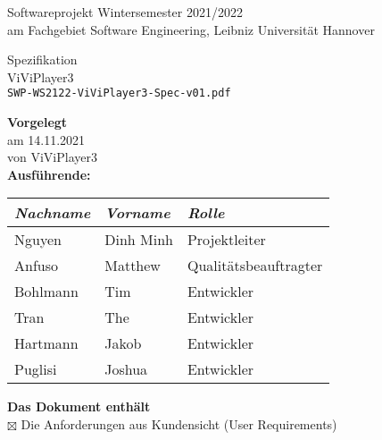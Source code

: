 \documentclass[a4paper, 12pt]{article}
\begin{document}
	\thispagestyle{empty} %
	\begin{center}
		{\Huge Softwareprojekt Wintersemester 2021/2022}\\[.35cm]
		{\large am Fachgebiet Software Engineering, Leibniz Universität Hannover}\\[.1cm]
	\end{center}
	\begin{center}
	\colorbox{lightlightgray}{
		\begin{minipage}{\linewidth}
			\begin{center}
				\vspace{0.2cm}
				{\Huge Spezifikation}\\[.1cm]
				{\Huge ViViPlayer3}\\[.3cm]
				\texttt{SWP-WS2122-ViViPlayer3-Spec-v01.pdf}
				\vspace{0.2cm}
			\end{center}
		\end{minipage}
	}
	\end{center}
	\textbf{Vorgelegt}\\
		\hspace*{1cm}am 14.11.2021 \\
		\hspace*{1cm}von ViViPlayer3\\[0.2cm]
	\textbf{Ausführende:}
		\begin{center}
			\begin{tabular}{|l|l|l|}
				\hline
				\textit{Nachname} 				& \textit{Vorname} 	& \textit{Rolle} \\ \hline\hline
				Nguyen							& Dinh Minh			& Projektleiter \\ \hline
				Anfuso							& Matthew			& Qualitätsbeauftragter \\ \hline
				Bohlmann						& Tim				& Entwickler \\ \hline
				Tran							& The				& Entwickler \\ \hline
				Hartmann						& Jakob				& Entwickler \\ \hline
				Puglisi							& Joshua			& Entwickler \\ \hline
			\end{tabular}
		\end{center}
		\vspace{0.3cm}
	\textbf{Das Dokument enthält}\\[0.1cm]
		\hspace*{1cm}$\boxtimes$ Die Anforderungen aus Kundensicht (User Requirements)\\[0.1cm]
\end{document}
